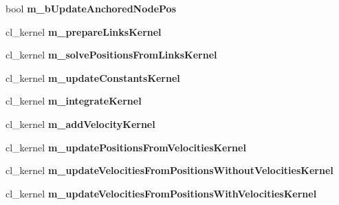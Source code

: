 \begin{DoxyCompactItemize}
\item 
\hypertarget{classbt_open_c_l_soft_body_solver_a8c1955f6a43d93e9b1afe942881b654c}{bool {\bfseries m\+\_\+b\+Update\+Anchored\+Node\+Pos}}\label{classbt_open_c_l_soft_body_solver_a8c1955f6a43d93e9b1afe942881b654c}

\item 
\hypertarget{classbt_open_c_l_soft_body_solver_a1d3cf1901af6e257440bfe010f6bfc77}{cl\+\_\+kernel {\bfseries m\+\_\+prepare\+Links\+Kernel}}\label{classbt_open_c_l_soft_body_solver_a1d3cf1901af6e257440bfe010f6bfc77}

\item 
\hypertarget{classbt_open_c_l_soft_body_solver_a454789617af5b4102b37b003846569f7}{cl\+\_\+kernel {\bfseries m\+\_\+solve\+Positions\+From\+Links\+Kernel}}\label{classbt_open_c_l_soft_body_solver_a454789617af5b4102b37b003846569f7}

\item 
\hypertarget{classbt_open_c_l_soft_body_solver_acb3c77d86ba527990b2ac070f42c2544}{cl\+\_\+kernel {\bfseries m\+\_\+update\+Constants\+Kernel}}\label{classbt_open_c_l_soft_body_solver_acb3c77d86ba527990b2ac070f42c2544}

\item 
\hypertarget{classbt_open_c_l_soft_body_solver_af4f0194e21365f292c47e88f2548a641}{cl\+\_\+kernel {\bfseries m\+\_\+integrate\+Kernel}}\label{classbt_open_c_l_soft_body_solver_af4f0194e21365f292c47e88f2548a641}

\item 
\hypertarget{classbt_open_c_l_soft_body_solver_a0a841abe03c0b3c002302c0eb387f9d9}{cl\+\_\+kernel {\bfseries m\+\_\+add\+Velocity\+Kernel}}\label{classbt_open_c_l_soft_body_solver_a0a841abe03c0b3c002302c0eb387f9d9}

\item 
\hypertarget{classbt_open_c_l_soft_body_solver_a3d54ea03905378f963b4a6f9d8d6180a}{cl\+\_\+kernel {\bfseries m\+\_\+update\+Positions\+From\+Velocities\+Kernel}}\label{classbt_open_c_l_soft_body_solver_a3d54ea03905378f963b4a6f9d8d6180a}

\item 
\hypertarget{classbt_open_c_l_soft_body_solver_a6d2dca9a3f99175f9a8382b3b052f2f2}{cl\+\_\+kernel {\bfseries m\+\_\+update\+Velocities\+From\+Positions\+Without\+Velocities\+Kernel}}\label{classbt_open_c_l_soft_body_solver_a6d2dca9a3f99175f9a8382b3b052f2f2}

\item 
\hypertarget{classbt_open_c_l_soft_body_solver_a5e8882dd8959a5b63fdb5f43b102122e}{cl\+\_\+kernel {\bfseries m\+\_\+update\+Velocities\+From\+Positions\+With\+Velocities\+Kernel}}\label{classbt_open_c_l_soft_body_solver_a5e8882dd8959a5b63fdb5f43b102122e}


\end{DoxyCompactItemize}
